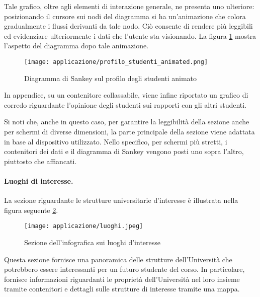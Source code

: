Tale grafico, oltre agli elementi di interazione generale, ne presenta uno ulteriore: posizionando il cursore sui nodi del diagramma si ha un'animazione 
che colora gradualmente i flussi derivanti da tale nodo. Ciò consente di rendere più leggibili ed evidenziare ulteriormente i dati che l'utente sta visionando.
La figura \ref{fig:app_profilo_stud_animated} mostra l'aspetto del diagramma dopo tale animazione.
\begin{figure}[H] 
    \centering 
    \texttt{[image: applicazione/profilo\_studenti\_animated.png]} 
    \caption{Diagramma di Sankey sul profilo degli studenti animato}
    \label{fig:app_profilo_stud_animated}
\end{figure}

In appendice, su un contenitore collassabile, viene infine riportato un grafico di corredo riguardante l'opinione degli studenti sui rapporti con gli altri studenti.

\bigskip
\noindent Si noti che, anche in questo caso, per garantire la leggibilità della sezione anche per schermi di diverse dimensioni, la parte principale della sezione viene adattata 
in base al dispositivo utilizzato. Nello specifico, per schermi più stretti, i contenitori dei dati e il diagramma di Sankey vengono posti uno sopra l'altro, piuttosto che affiancati.

\paragraph{Luoghi di interesse.} La sezione riguardante le strutture universitarie d'interesse è illustrata nella figura seguente \ref{fig:app_luoghi}. 
\begin{figure}[H] 
    \centering 
    \texttt{[image: applicazione/luoghi.jpeg]} 
    \caption{Sezione dell'infografica sui luoghi d'interesse}
    \label{fig:app_luoghi}
\end{figure}
\noindent Questa sezione fornisce una panoramica delle strutture dell'Università che potrebbero essere interessanti per un futuro studente del corso.
In particolare, fornisce informazioni riguardanti le proprietà dell'Università nel loro insieme tramite contenitori e dettagli sulle strutture di interesse 
tramite una mappa. 

